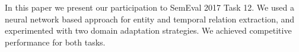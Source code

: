 In this paper we present our participation to SemEval 2017 Task 12. We used a neural network based approach for entity and temporal relation extraction, and experimented with two domain adaptation strategies. We achieved competitive performance for both tasks.
